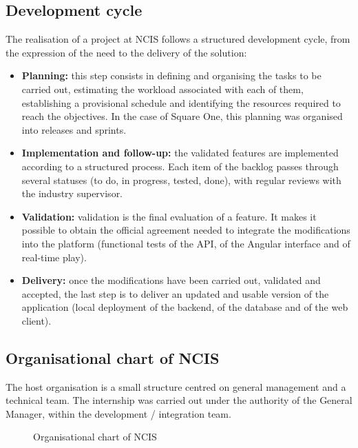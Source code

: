 \documentclass[12pt,a4paper,oneside]{report}
\newcommand{\StudentName}{Lasmer Dhia Eddin}
\begin{document}
\subsection{Development cycle}
The realisation of a project at NCIS follows a structured development cycle, from the expression of the need to the delivery of the solution:
\begin{itemize}[leftmargin=1.4em,itemsep=0.45em]
  \item \textbf{Planning:} this step consists in defining and organising the tasks to be carried out, estimating the workload associated with each of them, establishing a provisional schedule and identifying the resources required to reach the objectives. In the case of Square One, this planning was organised into releases and sprints.
  \item \textbf{Implementation and follow-up:} the validated features are implemented according to a structured process. Each item of the backlog passes through several statuses (to do, in progress, tested, done), with regular reviews with the industry supervisor.
  \item \textbf{Validation:} validation is the final evaluation of a feature. It makes it possible to obtain the official agreement needed to integrate the modifications into the platform (functional tests of the API, of the Angular interface and of real-time play).
  \item \textbf{Delivery:} once the modifications have been carried out, validated and accepted, the last step is to deliver an updated and usable version of the application (local deployment of the backend, of the database and of the web client).
\end{itemize}

\subsection{Organisational chart of NCIS}
The host organisation is a small structure centred on general management and a technical team. The internship was carried out under the authority of the General Manager, within the development / integration team.

\begin{figure}[H]
\centering
{}
\caption{Organisational chart of NCIS}
\end{figure}
\end{document}
